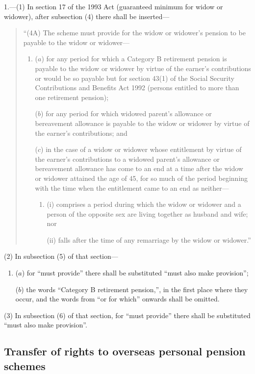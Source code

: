 \documentclass[12pt,a4paper]{article}
\begin{document}
1.---(1) In section 17 of the 1993 Act (guaranteed minimum for widow or widower), after subsection (4)  there shall be inserted—
\begin{quotation}
“(4A) The scheme must provide for the widow or widower’s pension to be payable to the widow or widower—
\begin{enumerate}\item[]
($a$) for any period for which a Category B retirement pension is payable to the widow or widower by virtue of the earner’s contributions or would be so payable but for section 43(1)  of the Social Security Contributions and Benefits Act 1992 (persons entitled to more than one retirement pension);

($b$) for any period for which widowed parent’s allowance or bereavement allowance is payable to the widow or widower by virtue of the earner’s contributions; and

($c$) in the case of a widow or widower whose entitlement by virtue of the earner’s contributions to a widowed parent’s allowance or bereavement allowance has come to an end at a time after the widow or widower attained the age of 45, for so much of the period beginning with the time when the entitlement came to an end as neither—
\begin{enumerate}\item[]
(i) comprises a period during which the widow or widower and a person of the opposite sex are living together as husband and wife; nor

(ii) falls after the time of any remarriage by the widow or widower.”
\end{enumerate}
\end{enumerate}
\end{quotation}

(2) In subsection (5)  of that section—
\begin{enumerate}\item[]
($a$) for “must provide” there shall be substituted “must also make provision”;

($b$) the words “Category B retirement pension,”, in the first place where they occur, and the words from “or for which” onwards shall be omitted.
\end{enumerate}

(3) In subsection (6)  of that section, for “must provide” there shall be substituted “must also make provision”.

\subsection*{Transfer of rights to overseas personal pension schemes}
\end{document}
